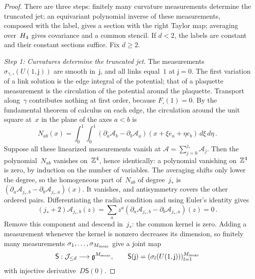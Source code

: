 \begin{proof}
There are three steps: finitely many curvature measurements determine the truncated jet; an equivariant polynomial inverse of these measurements, composed with the label, gives a section with the right Taylor map; averaging over~$H_4$ gives covariance and a common stencil. If $d<2$, the labels are constant and their constant sections suffice. Fix $d\ge2$.

\emph{Step 1: Curvatures determine the truncated jet.} The measurements $\sigma_{\gamma,\square}(U(1,\mathsf j))$ are smooth in~$\mathsf j$, and all links equal~$1$ at $\mathsf j=0$. The first variation of a link solution is the edge integral of the potential; that of a plaquette measurement is the circulation of the potential around the plaquette. Transport along~$\gamma$ contributes nothing at first order, because $F_\square(1)=0$. By the fundamental theorem of calculus on each edge, the circulation around the unit square at~$x$ in the plane of the axes $a<b$ is
\begin{equation*}
N_{ab}(x)=\int_0^1\!\int_0^1
(\partial_a\mathcal A_b-\partial_b\mathcal A_a)(x+\xi e_a+\eta e_b)\,d\xi\,d\eta\,.
\end{equation*}
Suppose all these linearized measurements vanish at $\mathcal A=\sum_{j=0}^{j_*}\mathcal A_j$. Then the polynomial~$N_{ab}$ vanishes on~$\mathbb{Z}^4$, hence identically: a polynomial vanishing on~$\mathbb{Z}^4$ is zero, by induction on the number of variables. The averaging shifts only lower the degree, so the homogeneous part of~$N_{ab}$ of degree~$j_*$ is $(\partial_a\mathcal A_{j_*,b}-\partial_b\mathcal A_{j_*,a})(x)$. It vanishes, and antisymmetry covers the other ordered pairs. Differentiating the radial condition and using Euler's identity gives
\begin{equation*}
(j_*+2)\mathcal A_{j_*,b}(z)=\sum_a z^a(\partial_a\mathcal A_{j_*,b}-\partial_b\mathcal A_{j_*,a})(z)=0\,.
\end{equation*}
Remove this component and descend in~$j_*$: the common kernel is zero. Adding a measurement whenever the kernel is nonzero decreases its dimension, so finitely many measurements $\sigma_1,\ldots,\sigma_{M_{\rm meas}}$ give a joint map
\begin{equation*}
\mathsf S:\mathcal J_{\le d}\longrightarrow\mathfrak{g}^{M_{\rm meas}},\qquad
\mathsf S(\mathsf j)=(\sigma_l(U(1,\mathsf j)))_{l=1}^{M_{\rm meas}}
\end{equation*}
with injective derivative~$D\mathsf S(0)$.


\end{proof}
